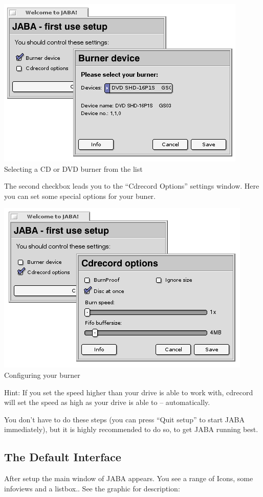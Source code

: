 \documentclass[a4paper,11pt]{article}
\begin{document}
\begin{center}
\includegraphics[width=226bp]{startsetup1.png} \\
Selecting a CD or DVD burner from the list
\end{center}

The second checkbox leads you to the ``Cdrecord Options'' settings window. Here you
can set some special options for your buner. 

\begin{center}
\includegraphics[width=230bp]{startsetup2.png} \\
Configuring your burner
\end{center}

\begin{center} \colorbox[gray]{.9}{ \parbox{12cm}{
Hint: If you set the speed higher than your drive is able to work with, cdrecord will set the speed as high as your drive is able to -- automatically.
}}\end{center}

You don't have to do these steps (you can press ``Quit setup'' to start JABA
immediately), but it is highly recommended to do so, to get JABA running best.

\subsection{The Default Interface}

After setup the main window of JABA appears.
You see a range of Icons, some infoviews and a listbox.. See the graphic for description:
\end{document}
